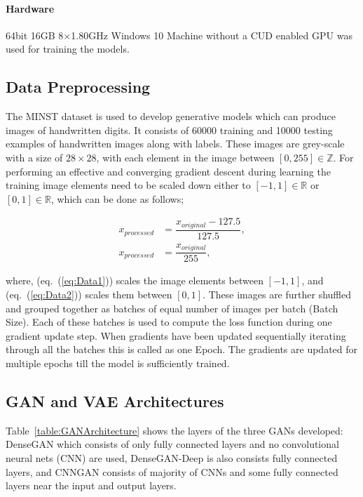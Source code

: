 \documentclass{article}
\begin{document}
	\paragraph{Hardware} 64bit 16GB 8$\times$1.80GHz Windows 10 Machine without a CUD enabled GPU was used for training the models.	
	
	\subsection{Data Preprocessing}\label{subsection:DataPreprocessing}
	
	The MINST dataset is used to develop generative models which can produce images of handwritten digits. It consists of $60000$ training and 10000 testing examples of handwritten images along with labels. These images are grey-scale with a size of $28\times28$, with each element in the image between $[0,255] \in \mathbb{Z}$. For performing an effective and converging gradient descent during learning the training image elements need to be scaled down either to $[-1,1] \in \mathbb{R}$ or $[0,1] \in \mathbb{R}$, which can be done as follows;
	
	\begin{align}
	x_{processed} &= \dfrac{x_{original} - 127.5}{127.5}, \label{eq:Data1} \\
	x_{processed} &= \dfrac{x_{original}}{255}, \label{eq:Data2} 
	\end{align}
	
	where, (eq.~(\ref{eq:Data1})) scales the image elements between $[-1,1]$, and  (eq.~(\ref{eq:Data2})) scales them between $[0,1]$. These images are further shuffled and grouped together as batches of equal number of images per batch (Batch Size). Each of these batches is used to compute the loss function during one gradient update step. When gradients have been updated sequentially iterating through all the batches this is called as one Epoch. The gradients are updated for multiple epochs till the model is sufficiently trained. 	   
	
	
	\subsection{GAN and VAE Architectures}\label{subsection:GanVaeArchitecture}
	
	Table~\ref{table:GANArchitecture} shows the layers of the three GANs developed: DenseGAN which consists of only fully connected layers and no convolutional neural nets (CNN) are used, DenseGAN-Deep is also consists fully connected layers, and CNNGAN consists of majority of CNNs and some fully connected layers near the input and output layers. 
	
\end{document}
